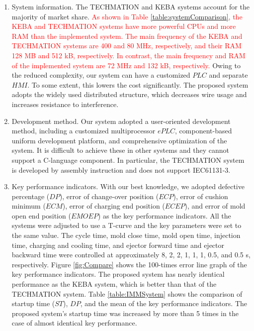 \documentclass[journal,UTF8]{IEEEtran}
\begin{document}
	\begin{enumerate}
		\item System information. The TECHMATION and KEBA systems account for the majority of market share. \textcolor{red}{As shown in Table \ref{table:systemComparison}, the KEBA and TECHMATION systems have more powerful CPUs and more RAM than the implemented system. The main frequency of the KEBA and TECHMATION systems are 400 and 80 MHz, respectively, and their RAM 128 MB and 512 kB, respectively. In contrast, the main frequency and RAM of the implemented system are 72 MHz and 132 kB, respectively.} Owing to the reduced complexity, our system can have a customized $PLC$ and separate $HMI$. To some extent, this lowers the cost significantly. The proposed system adopts the widely used distributed structure, which decreases wire usage and increases resistance to interference.
		\item Development method. Our system adopted a user-oriented development method, including a customized multiprocessor $ePLC$, component-based uniform development platform, and comprehensive optimization of the system. It is difficult to achieve these in other systems and they cannot support a C-language component. In particular, the TECHMATION system is developed by assembly instruction and does not support IEC61131-3.
		\item Key performance indicators. With our best knowledge, we adopted defective percentage ($DP$), error of change-over position ($ECP$), error of cushion minimum ($ECM$), error of charging end position ($ECEP$), and error of mold open end position ($EMOEP$) as the key performance indicators. All the systems were adjusted to use a T-curve and the key parameters were set to the same value. The cycle time, mold close time, mold open time, injection time, charging and cooling time, and ejector forward time and ejector backward time were controlled at approximately 8, 2, 2, 1, 1, 1, 0.5, and 0.5 s, respectively. Figure \ref{fig:Compare} shows the 100-times error line graph of the key performance indicators. The proposed system has nearly identical performance as the KEBA system, which is better than that of the TECHMATION system. Table \ref{table:IMMSystem} shows the comparison of startup time ($ST$), $DP$, and the mean of the key performance indicators. The proposed system's startup time was increased by more than 5 times in the case of almost identical key performance.
	\end{enumerate}
\end{document}
